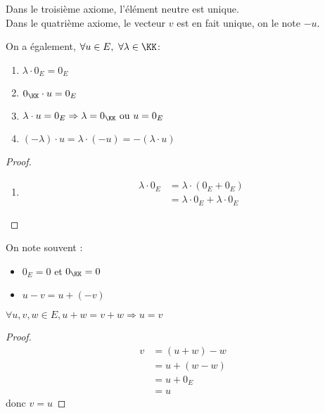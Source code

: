 \documentclass[../main.tex]{subfile}
\begin{document}
\begin{rema}
	Dans le troisième axiome, l'élément neutre est unique.\\
	Dans le quatrième axiome, le vecteur $v$ est en fait unique, on le note $-u$.
\end{rema}

\begin{prop}
	On a également, $\forall u \in E, \ \forall \lambda \in \KK$:
\begin{enumerate}
	\item $\lambda \cdot 0_E = 0_E$
	\item $0_{\KK} \cdot u = 0_E$
	\item $\lambda \cdot u = 0_E \Rightarrow \lambda = 0_\KK \ \text{ou} \ u = 0_E$
	\item $(-\lambda) \cdot u = \lambda \cdot (-u) = - (\lambda \cdot u)$
\end{enumerate}
\end{prop}

\begin{proof}
\begin{enumerate}
	\item 
$$
\begin{aligned}
	\lambda \cdot 0_E &= \lambda \cdot (0_E + 0_E)\\
	&= \lambda \cdot 0_E + \lambda \cdot 0_E
\end{aligned}
$$
\end{enumerate}
\end{proof}

\begin{nota}
	On note souvent :
\begin{itemize}
	\item $0_E = 0$ et $0_\KK = 0$
	\item $u - v = u + (-v)$
\end{itemize}
\end{nota}

\begin{lemme}
	$\forall u, v, w \in E, u + w = v + w \Rightarrow u = v$
\end{lemme}

\begin{proof}
	$$
\begin{aligned}
	v &= (u + w) - w\\
	&= u + (w - w)\\
	&= u + 0_E\\
	&= u
\end{aligned}
	$$
	donc $v = u$
\end{proof}
\end{document}
